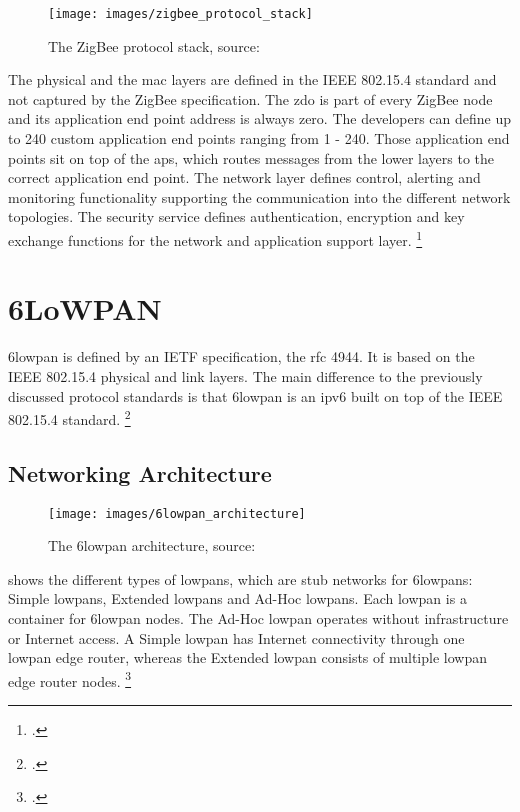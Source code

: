 \begin{figure}[ht]
  \centering
  \texttt{[image: images/zigbee\_protocol\_stack]}
  \caption{The ZigBee protocol stack, source: \cite[96]{Gomez2010}}
  \label{fig:zigbee_protocol_stack}
\end{figure}

The physical and the \gls{mac} layers are defined in the IEEE 802.15.4 standard and not captured by the ZigBee specification. The \gls{zdo} is part of every ZigBee node and its application end point address is always zero. The developers can define up to 240 custom application end points ranging from 1 - 240. Those application end points sit on top of the \gls{aps}, which routes messages from the lower layers to the correct application end point. The network layer defines control, alerting and monitoring functionality supporting the communication into the different network topologies. The security service defines authentication, encryption and key exchange functions for the network and application support layer. \footcite[Cf.][479-480]{Pahlavan2009}

\section{6LoWPAN}
\label{sec:6lowpan}

\gls{6lowpan} is defined by an IETF specification, the \gls{rfc} 4944. It is based on the IEEE 802.15.4 physical and link layers. The main difference to the previously discussed protocol standards is that \gls{6lowpan} is an \gls{ipv6} built on top of the IEEE 802.15.4 standard. \footcite[Cf.][]{RFC4944}

\subsection{Networking Architecture}

\begin{figure}[ht]
  \centering
  \texttt{[image: images/6lowpan\_architecture]}
  \caption{The \gls{6lowpan} architecture, source: \cite[14]{Shelby2009}}
  \label{fig:6lowpan_architecture}
\end{figure}

 shows the different types of \glspl{lowpan}, which are stub networks for \glspl{6lowpan}: Simple \glspl{lowpan}, Extended \glspl{lowpan} and Ad-Hoc \glspl{lowpan}. Each \gls{lowpan} is a container for \gls{6lowpan} nodes. The Ad-Hoc \gls{lowpan} operates without infrastructure or Internet access. A Simple \gls{lowpan} has Internet connectivity through one \gls{lowpan} edge router, whereas the Extended \gls{lowpan} consists of multiple \gls{lowpan} edge router nodes. \footcite[Cf.][13]{Shelby2009}

